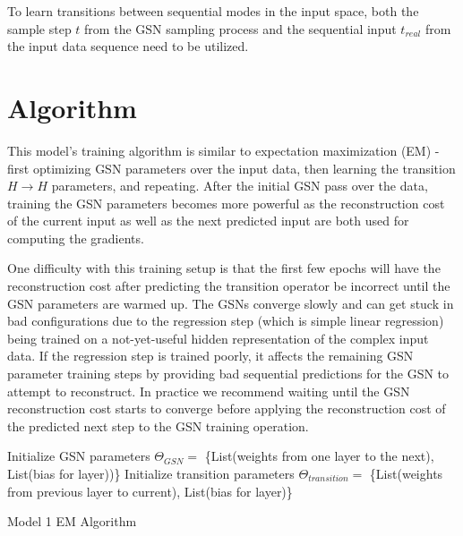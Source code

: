 To learn transitions between sequential modes in the input space, both the sample step \(t\) from the GSN sampling process and the sequential input \(t_{real}\) from the input data sequence need to be utilized.


\section{Algorithm}

This model's training algorithm is similar to expectation maximization (EM) - first optimizing GSN parameters over the input data, then learning the transition \(H \rightarrow H\) parameters, and repeating. After the initial GSN pass over the data, training the GSN parameters becomes more powerful as the reconstruction cost of the current input as well as the next predicted input are both used for computing the gradients.

One difficulty with this training setup is that the first few epochs will have the reconstruction cost after predicting the transition operator be incorrect until the GSN parameters are warmed up. The GSNs converge slowly and can get stuck in bad configurations due to the regression step (which is simple linear regression) being trained on a not-yet-useful hidden representation of the complex input data. If the regression step is trained poorly, it affects the remaining GSN parameter training steps by providing bad sequential predictions for the GSN to attempt to reconstruct. In practice we recommend waiting until the GSN reconstruction cost starts to converge before applying the reconstruction cost of the predicted next step to the GSN training operation.

\begin{algorithm}[h!]
	Initialize GSN parameters \(\Theta_{GSN} = \) \{List(weights from one layer to the next), List(bias for layer))\}\;
	Initialize transition parameters \(\Theta_{transition}=\) \{List(weights from previous layer to current), List(bias for layer)\} \;
	\caption{ Model 1 EM Algorithm }
\end{algorithm}


